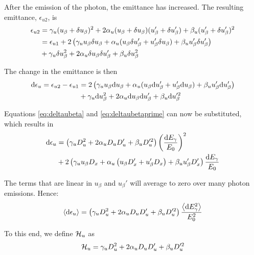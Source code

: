 After the emission of the photon, the emittance has increased. The resulting emittance, $\epsilon_{u2}$, is
\begin{align}
    \epsilon_{u2}   &= \gamma_u (u_\beta + \delta u_\beta)^2 + 2 \alpha_u (u_\beta + \delta u_\beta)(u_\beta' + \delta u_\beta') + \beta_u (u_\beta' + \delta u_\beta')^2 \notag\\
                    &= \epsilon_{u1} + 2 \left( \gamma_u u_\beta \delta u_\beta + \alpha_u (u_\beta \delta u_\beta' + u_\beta' \delta u_\beta) + \beta_u u_\beta' \delta u_\beta' \right)\notag \\
                    &+ \gamma_u \delta u_\beta^2 + 2 \alpha_u \delta u_\beta \delta u_\beta' + \beta_u \delta u_\beta^2
\end{align}

The change in the emittance is then
\begin{align}
    \text{d} \epsilon_u = \epsilon_{u2} - \epsilon_{u1} &= 2 \left( \gamma_u u_\beta \text{d} u_\beta + \alpha_u (u_\beta \text{d} u_\beta' + u_\beta' \text{d} u_\beta) + \beta_u u_\beta' \text{d} u_\beta' \right)\notag\\
                    &+ \gamma_u \text{d} u_\beta^2 + 2 \alpha_u \text{d} u_\beta \text{d} u_\beta' + \beta_u \text{d} u_\beta'^2
\end{align}

Equations \eqref{eq:deltaubeta} and \eqref{eq:deltaubetaprime} can now be substituted, which results in
\begin{align}
    \text{d} \epsilon_u &= \left( \gamma_u D_u^2 + 2 \alpha_u D_u D_u' + \beta_u D_u'^2 \right) \left( \frac{\text{d} E_\gamma}{E_0} \right)^2 \notag\\
                    &+ 2 \left( \gamma_u u_\beta D_x + \alpha_u \left( u_\beta D_x' + u_\beta' D_x \right) + \beta_u u_\beta'D_x' \right) \frac{\text{d} E_\gamma}{E_0}
\end{align}

The terms that are linear in $u_\beta$ and $u_\beta'$ will average to zero over many photon emissions. Hence:
\begin{equation}
    \left\langle {\text{d}\epsilon_u} \right\rangle = \left( \gamma_u D_u^2 + 2 \alpha_u D_u D_u' + \beta_u D_u'^2 \right) \frac{\left\langle {\text{d}E_\gamma^2} \right\rangle}{E_0^2}
\end{equation}

To this end, we define $\mathcal{H}_u$ as
\begin{equation}
    \mathcal{H}_u = \gamma_u D_u^2 + 2 \alpha_u D_u D_u' + \beta_u D_u'^2
\end{equation}

